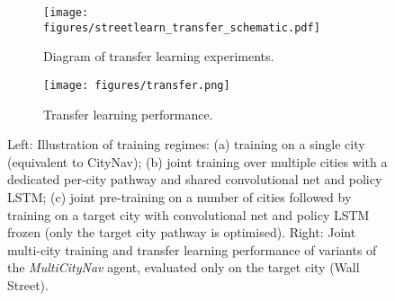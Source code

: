 \begin{figure}[t]
\begin{center}
\begin{subfigure}{.55\textwidth}
  \centering
  \texttt{[image: figures/streetlearn\_transfer\_schematic.pdf]}
  \caption{Diagram of transfer learning experiments.}
  \label{fig:transfer_diagram}
\end{subfigure}%
\begin{subfigure}{.45\textwidth}
  \centering
  \texttt{[image: figures/transfer.png]}
  \caption{Transfer learning performance.}
  \label{fig:transfer}
\end{subfigure}

\caption{
Left: Illustration of training regimes: (a) training on a single city (equivalent to CityNav); (b) joint training over multiple cities with a dedicated per-city pathway and shared convolutional net and policy LSTM; (c) joint pre-training on a number of cities followed by training on a target city with convolutional net and policy LSTM frozen (only the target city pathway is optimised).
Right: Joint multi-city training and transfer learning performance of variants of the \emph{MultiCityNav} agent, evaluated only on the target city (Wall Street).
}
\label{fig:transfer_experiments}
\end{center}
\vskip -0.25in
\end{figure}
